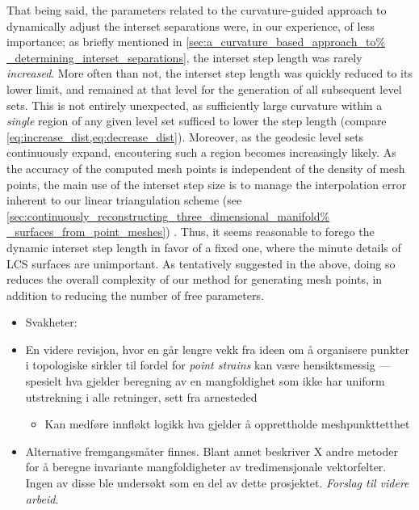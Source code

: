 That being said, the parameters related to the curvature-guided approach to
dynamically adjust the interset separations were, in our experience, of less
importance; as briefly mentioned in \cref{sec:a_curvature_based_approach_to%
_determining_interset_separations}, the interset step length was rarely
\emph{increased}. More often than not, the interset step length was quickly
reduced to its lower limit, and remained at that level for the generation of
all subsequent level sets. This is not entirely unexpected, as sufficiently
large curvature within a \emph{single} region of any given level set sufficed
to lower the step length (compare \cref{eq:increase_dist,eq:decrease_dist}).
Moreover, as the geodesic level sets continuously expand, encoutering such a
region becomes increasingly likely. As the accuracy of the computed mesh points
is independent of the density of mesh points, the main use of the interset step
size is to manage the interpolation error inherent to our linear triangulation
scheme (see \cref{sec:continuously_reconstructing_three_dimensional_manifold%
_surfaces_from_point_meshes}) \parencite{krauskopf2003computing}. Thus, it
seems reasonable to forego the dynamic interset step length in favor of a
fixed one, where the minute details of LCS surfaces are unimportant. As
tentatively suggested in the above, doing so reduces the overall complexity of
our method for generating mesh points, in addition to reducing the number of
free parameters.


\begin{framed}
    \begin{itemize}
        \item Svakheter:
            \item En videre revisjon, hvor en går lengre vekk fra ideen om å
                organisere punkter i topologiske sirkler til fordel for
                \emph{point strains} kan være hensiktsmessig --- spesielt hva
                gjelder beregning av en mangfoldighet som ikke har uniform
                utstrekning i alle retninger, sett fra arnesteded
                \begin{itemize}
                    \item Kan medføre innfløkt logikk hva gjelder å
                        opprettholde meshpunkttetthet
                \end{itemize}
                \item Alternative fremgangsmåter finnes. Blant annet beskriver
                    \textcite{krauskopf2005survey} X andre metoder for å
                    beregne invariante mangfoldigheter av tredimensjonale
                    vektorfelter. Ingen av disse ble undersøkt som en del av
                    dette prosjektet. \emph{Forslag til videre arbeid}.
    \end{itemize}
\end{framed}

